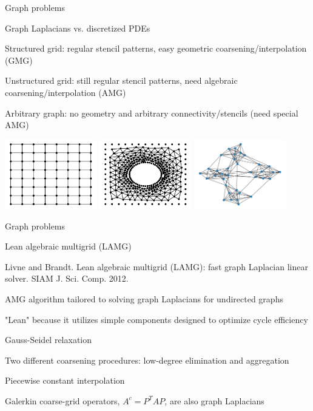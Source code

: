 \documentclass[18pt,xcolor=table]{beamer}
\begin{document}
\begin{frame}{Graph problems}
\begin{block}{Graph Laplacians vs. discretized PDEs}
\bit
\item Structured grid: regular stencil patterns, easy geometric coarsening/interpolation (GMG)
\item Unstructured grid: still regular stencil patterns, need algebraic coarsening/interpolation (AMG)
\item Arbitrary graph: no geometry and arbitrary connectivity/stencils (need special AMG)
\eit
\end{block}
\begin{center}
\includegraphics[width=0.3\textwidth]{../figures/structuredGrid}
\includegraphics[width=0.3\textwidth]{../figures/unstructuredGrid}
\includegraphics[width=0.3\textwidth]{../figures/graph}
\end{center}
\end{frame}

\begin{frame}{Graph problems}
\begin{block}{Lean algebraic multigrid (LAMG)}
\bit
\item Livne and Brandt. Lean algebraic multigrid (LAMG): fast graph Laplacian linear solver. SIAM J. Sci. Comp. 2012.
\item AMG algorithm tailored to solving graph Laplacians for undirected graphs
\item "Lean" because it utilizes simple components designed to optimize cycle efficiency
\bit
\item Gauss-Seidel relaxation
\item Two different coarsening procedures: low-degree elimination and aggregation
\item Piecewise constant interpolation
\item Galerkin coarse-grid operators, $A^c = P^TAP$, are also graph Laplacians
\item 
\eit
\eit
\end{block}
\end{frame}
\end{document}
